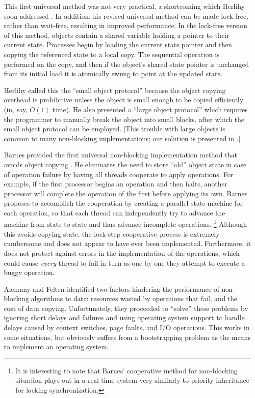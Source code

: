 This first universal method was not very practical, a shortcoming
which Herlihy soon addressed \cite{Herlihy93}.  In addition, his revised universal
method can be made lock-free, rather than wait-free, resulting in
improved performance.  In the lock-free version of this method,
objects contain a shared variable
holding a pointer to their current state.  Processes begin by loading
the current state pointer and then copying the referenced state to a
local copy.  The sequential operation is performed on the
copy, and then if the object's shared state pointer is unchanged from
its initial load it is atomically swung to point at the updated state.

Herlihy called this the ``small object protocol'' because the object
copying overhead is prohibitive unless the object is small enough to
be copied efficiently (in, say, $O(1)$ time).  He also presented a
``large object protocol'' which requires the programmer to
manually break the object into small blocks, after which the small
object protocol can be employed. 
[This trouble with large objects is
common to many non-blocking implementations; our solution is presented
in .]

Barnes provided the first universal non-blocking implementation
method that avoids object copying \cite{Barnes93}.  He eliminates the
need to store ``old'' object
state in case of operation failure by having all threads cooperate to
apply operations.  For example, if the first processor begins an operation
and then halts, another processor will complete the operation of the first
before applying its own.  Barnes proposes to accomplish the
cooperation by creating a parallel state machine for each operation,
so that each thread can independently try to advance the machine from state
to state and thus advance incomplete operations.%
\footnote{It is interesting to note that Barnes' cooperative method
  for non-blocking 
  situation plays out in a real-time system very similarly to priority
  inheritance for locking synchronization.}
Although this avoids
copying state, the lock-step cooperative process is extremely
cumbersome and does not appear to have ever been implemented.
Furthermore, it does not protect against errors in the implementation
of the operations, which could cause \emph{every} thread to fail in turn
as one by one they attempt to execute a buggy operation.

Alemany and Felten \cite{AlemanyFe92} identified two factors hindering the
performance of non-blocking algorithms to date: resources wasted by operations
that fail, and the cost of data copying.  Unfortunately, they
proceeded to
``solve'' these problems by ignoring short delays and failures and
using operating system support to handle delays caused by
context switches, page faults, and
I/O operations.  This works in some situations, but obviously suffers
from a bootstrapping problem as the means to implement an operating system.

